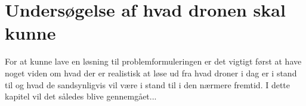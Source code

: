 \chapter{Undersøgelse af hvad dronen skal kunne}\label{ch:dronekunnen}
For at kunne lave en løsning til problemformuleringen er det vigtigt først at have noget viden om hvad der er realistisk at løse ud fra hvad droner i dag er i stand til og hvad de sandsynligvis vil være i stand til i den nærmere fremtid. I dette kapitel vil det således blive gennemgået...